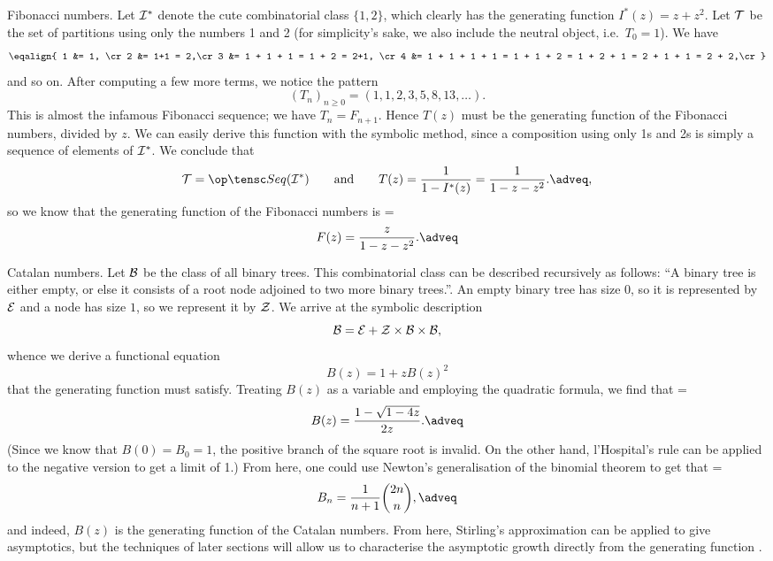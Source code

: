\boldlabel Fibonacci numbers. Let ${\cal I}^*$ denote the cute combinatorial class $\{1,2\}$,
which clearly has the generating function $I^*(z) = z + z^2$. Let ${\cal T}$ be the set of partitions
using only the numbers 1 and 2 (for simplicity's sake, we also include the neutral object, i.e.\ $T_0=1$).
We have
$$\eqalign{
1 &= 1, \cr
2 &= 1+1 = 2,\cr
3 &= 1 + 1 + 1 = 1 + 2 = 2+1, \cr
4 &= 1 + 1 + 1 + 1 = 1 + 1 + 2 = 1 + 2 + 1 = 2 + 1 + 1 = 2 + 2,\cr
}$$
and so on. After computing a few more terms, we notice the pattern
$$(T_n)_{n\geq 0} = (1,1,2,3,5,8,13,\ldots).$$
This is almost the infamous Fibonacci sequence; we have $T_n = F_{n+1}$.
Hence $T(z)$ must be the generating function
of the Fibonacci numbers, divided by $z$.
We can easily derive this function with the symbolic method, since a composition
using only 1s and 2s is simply a sequence of elements of ${\cal I}^*$. We conclude that
$$\T = \Seq(\I^*)\qquad\hbox{and}\qquad T(z) = {1\over 1-I^*(z)} = {1\over 1-z-z^2}.\adveq,$$
so we know that the generating function of the Fibonacci numbers is
\newcount\fibeq
\fibeq=\eqcount
$$F(z) = {z\over 1-z-z^2}.\adveq$$
\medskip

\boldlabel Catalan numbers. Let ${\cal B}$ be the class of all binary trees. This combinatorial class
can be described recursively as follows: ``A binary tree is either empty, or else it consists of
a root node adjoined to two more binary trees.''. An empty binary tree has size 0, so it is represented
by ${\cal E}$ and a node has size $1$, so we represent it by ${\cal Z}$. We arrive at the symbolic description
$${\cal B} = {\cal E} + {\cal Z}\times{\cal B}\times{\cal B},$$
whence we derive a functional equation
$$B(z) = 1 + zB(z)^2$$
that the generating function must satisfy. Treating $B(z)$ as a variable and employing
the quadratic formula, we find that
\newcount\catalaneq
\catalaneq=\eqcount
$$B(z) = {1 - \sqrt{1-4z}\over 2z}.\adveq$$
(Since we know that $B(0) = B_0 = 1$, the positive branch of the square root is invalid.
On the other hand, l'Hospital's rule can be applied to the negative version to get a limit of 1.)
From here, one could use Newton's generalisation of the binomial theorem to get that
\newcount\catalanformula
\catalanformula=\eqcount
$$B_n = {1\over n+1}{2n\choose n},\adveq$$
and indeed, $B(z)$ is the generating function of the Catalan numbers. From here, Stirling's approximation
can be applied to give asymptotics, but the techniques of later sections will allow us to characterise
the asymptotic growth directly from the generating function .
\medskip


